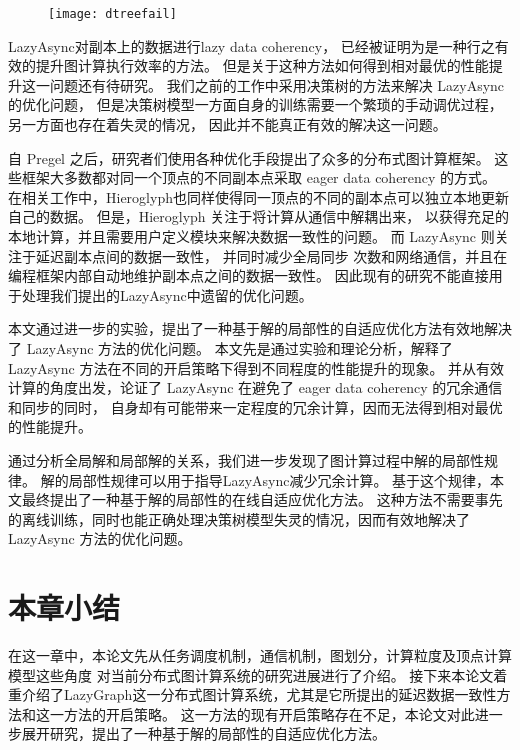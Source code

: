 \begin{figure}[!htbp]
\centering
\texttt{[image: dtreefail]}
\label{fig:dtfail}
\end{figure}

LazyAsync对副本上的数据进行lazy data coherency，
已经被证明为是一种行之有效的提升图计算执行效率的方法。
但是关于这种方法如何得到相对最优的性能提升这一问题还有待研究。
我们之前的工作中采用决策树的方法来解决 LazyAsync 的优化问题，
但是决策树模型一方面自身的训练需要一个繁琐的手动调优过程，另一方面也存在着失灵的情况，
因此并不能真正有效的解决这一问题。


自 Pregel 之后，研究者们使用各种优化手段提出了众多的分布式图计算框架。
这些框架大多数都对同一个顶点的不同副本点采取 eager data coherency 的方式。
在相关工作中，Hieroglyph\cite{ju2017hieroglyph}也同样使得同一顶点的不同的副本点可以独立本地更新自己的数据。
但是，Hieroglyph 关注于将计算从通信中解耦出来， 以获得充足的本地计算，并且需要用户定义模块来解决数据一致性的问题。
而 LazyAsync 则关注于延迟副本点间的数据一致性， 并同时减少全局同步 次数和网络通信，并且在编程框架内部自动地维护副本点之间的数据一致性。 
因此现有的研究不能直接用于处理我们提出的LazyAsync中遗留的优化问题。


本文通过进一步的实验，提出了一种基于解的局部性的自适应优化方法有效地解决了 LazyAsync 方法的优化问题。
本文先是通过实验和理论分析，解释了LazyAsync 方法在不同的开启策略下得到不同程度的性能提升的现象。
并从有效计算的角度出发，论证了 LazyAsync 在避免了 eager data coherency 的冗余通信和同步的同时，
自身却有可能带来一定程度的冗余计算，因而无法得到相对最优的性能提升。

通过分析全局解和局部解的关系，我们进一步发现了图计算过程中解的局部性规律。
解的局部性规律可以用于指导LazyAsync减少冗余计算。
基于这个规律，本文最终提出了一种基于解的局部性的在线自适应优化方法。
这种方法不需要事先的离线训练，同时也能正确处理决策树模型失灵的情况，因而有效地解决了
LazyAsync 方法的优化问题。

\section{本章小结}
在这一章中，本论文先从任务调度机制，通信机制，图划分，计算粒度及顶点计算模型这些角度
对当前分布式图计算系统的研究进展进行了介绍。
接下来本论文着重介绍了LazyGraph这一分布式图计算系统，尤其是它所提出的延迟数据一致性方法和这一方法的开启策略。
这一方法的现有开启策略存在不足，本论文对此进一步展开研究，提出了一种基于解的局部性的自适应优化方法。
